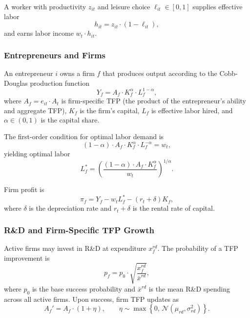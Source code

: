 \documentclass[12pt]{article}
\begin{document}
A worker with productivity $z_{it}$ and leisure choice $\ell_{it} \in [0, 1]$ supplies effective labor
\begin{equation}\label{eq:effective_labor}
  h_{it} = z_{it} \cdot (1 - \ell_{it}),
\end{equation}
and earns labor income $w_t \cdot h_{it}$.

\subsubsection{Entrepreneurs and Firms}

An entrepreneur $i$ owns a firm $f$ that produces output according to the Cobb-Douglas production function
\begin{equation}\label{eq:firm_production}
  Y_f = A_f \cdot K_f^{\alpha} \cdot L_f^{1-\alpha},
\end{equation}
where $A_f = e_{it} \cdot A_t$ is firm-specific TFP (the product of the entrepreneur's ability and aggregate TFP), $K_f$ is the firm's capital, $L_f$ is effective labor hired, and $\alpha \in (0, 1)$ is the capital share.

The first-order condition for optimal labor demand is
\begin{equation}\label{eq:foc_labor}
  (1 - \alpha) \cdot A_f \cdot K_f^{\alpha} \cdot L_f^{-\alpha} = w_t,
\end{equation}
yielding optimal labor
\begin{equation}\label{eq:optimal_labor}
  L_f^* = \left(\frac{(1-\alpha) \cdot A_f \cdot K_f^{\alpha}}{w_t}\right)^{1/\alpha}.
\end{equation}

Firm profit is
\begin{equation}\label{eq:firm_profit}
  \pi_f = Y_f - w_t L_f^* - (r_t + \delta) K_f,
\end{equation}
where $\delta$ is the depreciation rate and $r_t + \delta$ is the rental rate of capital.

\subsubsection{R\&D and Firm-Specific TFP Growth}

Active firms may invest in R\&D at expenditure $x_f^{rd}$. The probability of a TFP improvement is
\begin{equation}\label{eq:rd_prob}
  p_f = p_0 \cdot \sqrt{\frac{x_f^{rd}}{\bar{x}^{rd}}},
\end{equation}
where $p_0$ is the base success probability and $\bar{x}^{rd}$ is the mean R\&D spending across all active firms. Upon success, firm TFP updates as
\begin{equation}\label{eq:rd_improvement}
  A_f' = A_f \cdot (1 + \eta), \qquad \eta \sim \max\left\{0,\, \mathcal{N}(\mu_{rd}, \sigma_{rd}^2)\right\}.
\end{equation}
\end{document}
